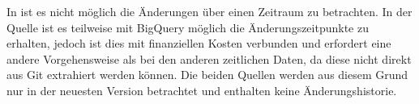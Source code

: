 In  ist es nicht möglich die Änderungen über einen Zeitraum zu betrachten.
In der  Quelle ist es teilweise mit BigQuery möglich die Änderungszeitpunkte zu erhalten, jedoch ist dies mit finanziellen Kosten verbunden und erfordert eine andere Vorgehensweise als bei den anderen zeitlichen Daten, da diese nicht direkt aus Git extrahiert werden können.
Die beiden Quellen werden aus diesem Grund nur in der neuesten Version betrachtet und enthalten keine Änderungshistorie.







